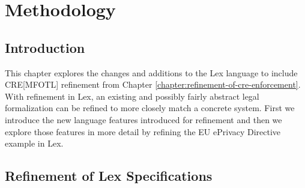 \chapter{Methodology}
\label{chapter:methodology}

\section{Introduction}
\label{section:methodology-introduction}

This chapter explores the changes and additions
to the Lex language to include CRE[MFOTL]
refinement from Chapter \ref{chapter:refinement-of-cre-enforcement}.
With refinement in Lex, an existing and possibly fairly abstract
legal formalization can be refined to more closely match
a concrete system.
First we introduce the new language features introduced
for refinement and then we explore those features in more
detail by refining the EU ePrivacy Directive example
in Lex.

\section{Refinement of Lex Specifications}
\label{section:methodology-refinement-of-lex-specifications}

